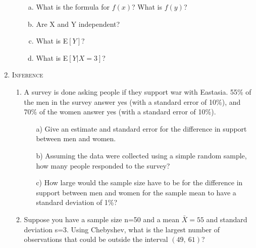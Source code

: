 \documentclass[11pt,letterpaper]{article}
\numberwithin{equation}{section}
\begin{document}
\begin{enumerate}[I]
\begin{enumerate}[1)]
\begin{enumerate}[a)]
\item What is the formula for $f(x)$?  What is $f(y)$? 
\item Are X and Y independent? %
\item What is E$[Y]$? 
\item What is E$[Y|X=3]$? 
\end{enumerate}

\end{enumerate}


\item \textsc{Inference} 

\begin{enumerate}[1)]

\item A survey is done asking people if they support war with Eastasia.  55\% of the men in the survey answer yes (with a standard error of 10\%), and 70\% of the women answer yes (with a standard error of 10\%).
\begin{enumerate}
\item[a)]  Give an estimate and standard error for the difference in support between men and women.
\item[b)]  Assuming the data were collected using a simple random sample, how many people responded to the survey?

\item[c)]  How large would the sample size have to be for the difference in support between men and women for the sample mean to have a standard deviation of 1\%?
\end{enumerate}
\item Suppose you have a sample size n=50 and a mean $\bar{X}=55$ and standard deviation s=3.  Using Chebyshev, what is the largest number of observations that could be outside the interval $(49,\ 61)$?



\end{enumerate}


\end{enumerate}
\end{document}
